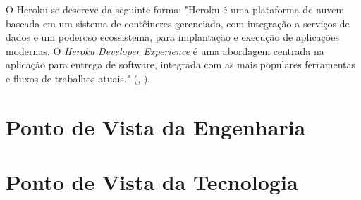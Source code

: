 	        O Heroku se descreve da seguinte forma: "Heroku é uma plataforma de nuvem baseada em um sistema de contêineres gerenciado, com integração a serviços de dados e um poderoso ecossistema, para implantação e execução de aplicações modernas. O \textit{Heroku Developer Experience} é uma abordagem centrada na aplicação para entrega de software, integrada com as mais populares ferramentas e fluxos de trabalhos atuais." (\citeauthor{herokuplatform}, \citeyear{herokuplatform}).
	        
	\section{Ponto de Vista da Engenharia}
	\section{Ponto de Vista da Tecnologia}
